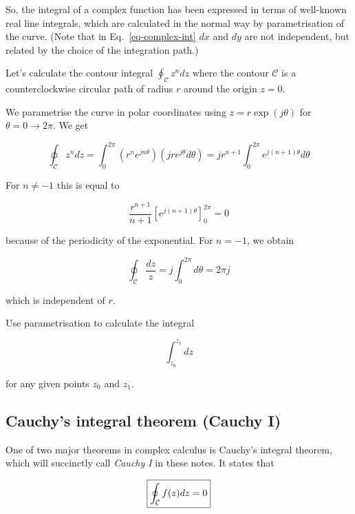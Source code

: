 So, the integral of a complex function has been expressed in terms of well-known
real line integrals, which are calculated in the normal way by parametrisation
of the curve. (Note that in Eq.~\ref{eq-complex-int} $dx$ and $dy$ are not
independent, but related by the choice of the integration path.)

\begin{sidebar}
\begin{exa}
Let's calculate the contour integral $\oint_\mathcal{C}z^ndz$ where the contour $\mathcal{C}$ is a counterclockwise circular path of radius $r$ around the origin $z=0$.

We parametrise the curve in polar coordinates using $z=r\exp(j\theta)$ for $\theta=0\to 2 \pi$. We get

$$\oint_\mathcal{C} z^n dz = \int_0^{2\pi} \left(r^n e^{jn\theta}\right) \left(jr e^{j \theta}d \theta\right)=j r^{n+1} \int_0^{2\pi} e^{j(n+1)\theta} d \theta $$

For $n \neq -1$ this is equal to

$$ \frac{r^{n+1}}{n+1}\left[e^{j(n+1)\theta}\right]_0^{2\pi}=0 $$

because of the periodicity of the exponential. For $n=-1$, we obtain 

$$ \oint_\mathcal{C} \frac{dz}{z} = j \int_0^{2\pi} d \theta = 2 \pi j $$

which is independent of $r$.

\end{exa}
\end{sidebar}

\begin{sidebar}
\begin{ex}
Use parametrisation to calculate the integral

$$\int_{z_0}^{z_1} dz$$

for any given points $z_0$ and $z_1$.
\end{ex}
\end{sidebar}

\subsection{Cauchy's integral theorem (Cauchy I)}

One of two major theorems in complex calculus is Cauchy's integral theorem,
which will succinctly call \emph{Cauchy I} in these notes. It states that 

\begin{equation}
\fbox{$\displaystyle
\oint_{\mathcal{C}} f(z) dz = 0 \label{eq-cauchy-1}
$}
\end{equation}

